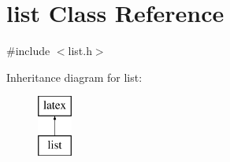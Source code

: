 \hypertarget{classlist}{\section{list Class Reference}
\label{classlist}
}


{\ttfamily \#include $<$list.\-h$>$}

Inheritance diagram for list\-:\begin{figure}[H]
\begin{center}
\leavevmode
\includegraphics[height=2.000000cm]{classlist}
\end{center}
\end{figure}
